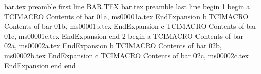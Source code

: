 bar.tex preamble first line
        BAR.TEX
bar.tex preamble last line
begin
1
begin
a
TCIMACRO
Contents of bar 01a, ms00001a.tex
EndExpansion
b
TCIMACRO
Contents of bar 01b, ms00001b.tex
EndExpansion
c
TCIMACRO
Contents of bar 01c, ms00001c.tex
EndExpansion
end
2
begin
a
TCIMACRO
Contents of bar 02a, ms00002a.tex
EndExpansion
b
TCIMACRO
Contents of bar 02b, ms00002b.tex
EndExpansion
c
TCIMACRO
Contents of bar 02c, ms00002c.tex
EndExpansion
end
end
